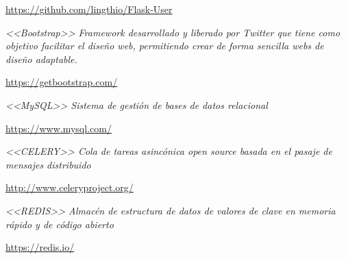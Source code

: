 \documentclass[a4paper]{article}
\begin{document}
\begin{thebibliography}{X}
\url{https://github.com/lingthio/Flask-User}


 \textit{<<Bootstrap>> Framework desarrollado y liberado por Twitter que tiene como objetivo facilitar el diseño web, permitiendo crear de forma sencilla webs de diseño adaptable.}

\url{https://getbootstrap.com/}


 \textit{<<MySQL>> Sistema de gestión de bases de datos relacional}

\url{https://www.mysql.com/}


 \textit{<<CELERY>> Cola de tareas asincónica open source basada en el pasaje de mensajes distribuido}

\url{http://www.celeryproject.org/}


 \textit{<<REDIS>> Almacén de estructura de datos de valores de clave en memoria rápido y de código abierto}

\url{https://redis.io/}


\end{thebibliography}
\end{document}
